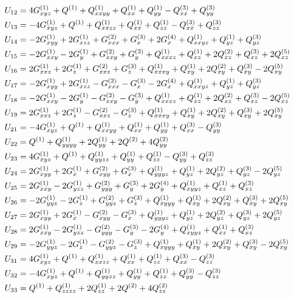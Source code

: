 \documentclass[11pt]{easymemo}
\begin{document}
\begin{align}
\cr&
U_{12}=4G^{(1)}_{xyz} + Q^{(1)} + Q^{(1)}_{xxyy} + Q^{(1)}_{xx} + Q^{(1)}_{yy} - Q^{(3)}_{xx} + Q^{(3)}_{yy}
\cr&
U_{13}=-4G^{(1)}_{xyz} + Q^{(1)} + Q^{(1)}_{xxzz} + Q^{(1)}_{xx} + Q^{(1)}_{zz} - Q^{(3)}_{xx} + Q^{(3)}_{zz}
\cr&
U_{14}=-2G^{(1)}_{xyy} + 2G^{(1)}_{xzz} + G^{(2)}_{xxx} + G^{(3)}_{x} + 2G^{(4)}_{x} + Q^{(1)}_{xxyz} + Q^{(1)}_{yz} + Q^{(3)}_{yz}
\cr&
U_{15}=-2G^{(1)}_{xxy} - 2G^{(1)}_{y} + G^{(2)}_{xxy} + G^{(3)}_{y} + Q^{(1)}_{xxxz} + Q^{(1)}_{xz} + 2Q^{(2)}_{xz} + Q^{(3)}_{xz} + 2Q^{(5)}_{xz}
\cr&
U_{16}=2G^{(1)}_{xxz} + 2G^{(1)}_{z} + G^{(2)}_{xxz} + G^{(3)}_{z} + Q^{(1)}_{xxxy} + Q^{(1)}_{xy} + 2Q^{(2)}_{xy} + Q^{(3)}_{xy} - 2Q^{(5)}_{xy}
\cr&
U_{17}=-2G^{(1)}_{xyy} + 2G^{(1)}_{xzz} - G^{(2)}_{xxx} - G^{(3)}_{x} - 2G^{(4)}_{x} + Q^{(1)}_{xxyz} + Q^{(1)}_{yz} + Q^{(3)}_{yz}
\cr&
U_{18}=-2G^{(1)}_{xxy} - 2G^{(1)}_{y} - G^{(2)}_{xxy} - G^{(3)}_{y} + Q^{(1)}_{xxxz} + Q^{(1)}_{xz} + 2Q^{(2)}_{xz} + Q^{(3)}_{xz} - 2Q^{(5)}_{xz}
\cr&
U_{19}=2G^{(1)}_{xxz} + 2G^{(1)}_{z} - G^{(2)}_{xxz} - G^{(3)}_{z} + Q^{(1)}_{xxxy} + Q^{(1)}_{xy} + 2Q^{(2)}_{xy} + Q^{(3)}_{xy} + 2Q^{(5)}_{xy}
\cr&
U_{21}=-4G^{(1)}_{xyz} + Q^{(1)} + Q^{(1)}_{xxyy} + Q^{(1)}_{xx} + Q^{(1)}_{yy} + Q^{(3)}_{xx} - Q^{(3)}_{yy}
\cr&
U_{22}=Q^{(1)} + Q^{(1)}_{yyyy} + 2Q^{(1)}_{yy} + 2Q^{(2)} + 4Q^{(2)}_{yy}
\cr&
U_{23}=4G^{(1)}_{xyz} + Q^{(1)} + Q^{(1)}_{yyzz} + Q^{(1)}_{yy} + Q^{(1)}_{zz} - Q^{(3)}_{yy} + Q^{(3)}_{zz}
\cr&
U_{24}=2G^{(1)}_{xyy} + 2G^{(1)}_{x} + G^{(2)}_{xyy} + G^{(3)}_{x} + Q^{(1)}_{yyyz} + Q^{(1)}_{yz} + 2Q^{(2)}_{yz} + Q^{(3)}_{yz} - 2Q^{(5)}_{yz}
\cr&
U_{25}=2G^{(1)}_{xxy} - 2G^{(1)}_{yzz} + G^{(2)}_{yyy} + G^{(3)}_{y} + 2G^{(4)}_{y} + Q^{(1)}_{xyyz} + Q^{(1)}_{xz} + Q^{(3)}_{xz}
\cr&
U_{26}=-2G^{(1)}_{yyz} - 2G^{(1)}_{z} + G^{(2)}_{yyz} + G^{(3)}_{z} + Q^{(1)}_{xyyy} + Q^{(1)}_{xy} + 2Q^{(2)}_{xy} + Q^{(3)}_{xy} + 2Q^{(5)}_{xy}
\cr&
U_{27}=2G^{(1)}_{xyy} + 2G^{(1)}_{x} - G^{(2)}_{xyy} - G^{(3)}_{x} + Q^{(1)}_{yyyz} + Q^{(1)}_{yz} + 2Q^{(2)}_{yz} + Q^{(3)}_{yz} + 2Q^{(5)}_{yz}
\cr&
U_{28}=2G^{(1)}_{xxy} - 2G^{(1)}_{yzz} - G^{(2)}_{yyy} - G^{(3)}_{y} - 2G^{(4)}_{y} + Q^{(1)}_{xyyz} + Q^{(1)}_{xz} + Q^{(3)}_{xz}
\cr&
U_{29}=-2G^{(1)}_{yyz} - 2G^{(1)}_{z} - G^{(2)}_{yyz} - G^{(3)}_{z} + Q^{(1)}_{xyyy} + Q^{(1)}_{xy} + 2Q^{(2)}_{xy} + Q^{(3)}_{xy} - 2Q^{(5)}_{xy}
\cr&
U_{31}=4G^{(1)}_{xyz} + Q^{(1)} + Q^{(1)}_{xxzz} + Q^{(1)}_{xx} + Q^{(1)}_{zz} + Q^{(3)}_{xx} - Q^{(3)}_{zz}
\cr&
U_{32}=-4G^{(1)}_{xyz} + Q^{(1)} + Q^{(1)}_{yyzz} + Q^{(1)}_{yy} + Q^{(1)}_{zz} + Q^{(3)}_{yy} - Q^{(3)}_{zz}
\cr&
U_{33}=Q^{(1)} + Q^{(1)}_{zzzz} + 2Q^{(1)}_{zz} + 2Q^{(2)} + 4Q^{(2)}_{zz}

\end{align}
\end{document}

